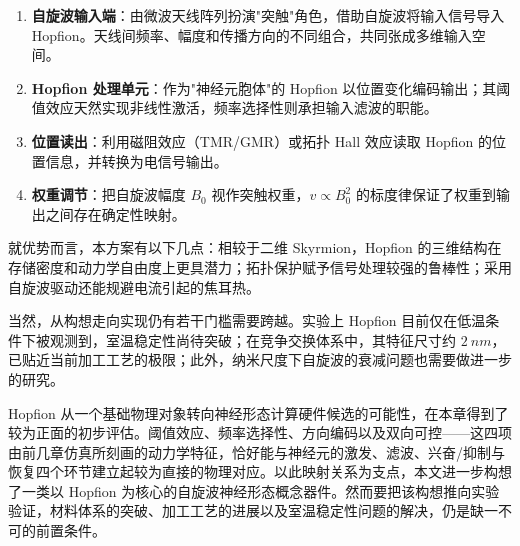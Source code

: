 \begin{enumerate}
  \item \textbf{自旋波输入端}：由微波天线阵列扮演"突触"角色，借助自旋波将输入信号导入 Hopfion。天线间频率、幅度和传播方向的不同组合，共同张成多维输入空间。
  \item \textbf{Hopfion 处理单元}：作为"神经元胞体"的 Hopfion 以位置变化编码输出；其阈值效应天然实现非线性激活，频率选择性则承担输入滤波的职能。
  \item \textbf{位置读出}：利用磁阻效应（TMR/GMR）或拓扑 Hall 效应读取 Hopfion 的位置信息，并转换为电信号输出。
  \item \textbf{权重调节}：把自旋波幅度 $B_0$ 视作突触权重，$v \propto B_0^2$ 的标度律保证了权重到输出之间存在确定性映射。
\end{enumerate}

就优势而言，本方案有以下几点：相较于二维 Skyrmion，Hopfion 的三维结构在存储密度和动力学自由度上更具潜力；拓扑保护赋予信号处理较强的鲁棒性；采用自旋波驱动还能规避电流引起的焦耳热。

当然，从构想走向实现仍有若干门槛需要跨越。实验上 Hopfion 目前仅在低温条件下被观测到\cite{zheng2023hopfion}，室温稳定性尚待突破；在竞争交换体系中，其特征尺寸约 $\SI{2}{nm}$，已贴近当前加工工艺的极限；此外，纳米尺度下自旋波的衰减问题也需要做进一步的研究。


Hopfion 从一个基础物理对象转向神经形态计算硬件候选的可能性，在本章得到了较为正面的初步评估。阈值效应、频率选择性、方向编码以及双向可控——这四项由前几章仿真所刻画的动力学特征，恰好能与神经元的激发、滤波、兴奋/抑制与恢复四个环节建立起较为直接的物理对应。以此映射关系为支点，本文进一步构想了一类以 Hopfion 为核心的自旋波神经形态概念器件。然而要把该构想推向实验验证，材料体系的突破、加工工艺的进展以及室温稳定性问题的解决，仍是缺一不可的前置条件。
